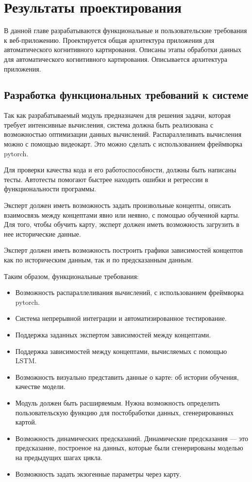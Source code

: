 \chapter{Результаты проектирования}

\begin{annotation}
	В данной главе разрабатываются функциональные и пользовательские требования к веб-приложению.
	Проектируется общая архитектура приложения для автоматического когнитивного картирования.
	Описаны этапы обработки данных для автоматического когнитивного картирования.
	Описывается архитектура приложения.
\end{annotation}


\section{Разработка функциональных требований к системе}

Так как разрабатываемый модуль предназначен для решения задачи, которая
требует интенсивные вычисления, система должна быть реализована
с возможностью оптимизации данных вычислений. Распараллеливать вычисления
можно с помощью видеокарт. Это можно сделать с использованием фреймворка pytorch.

Для проверки качества кода и его работоспособности, должны быть написаны тесты.
Автотесты помогают быстрее находить ошибки и регрессии в функциональности программы.

Эксперт должен иметь возможность задать произвольные концепты, описать
взаимосвязь между концептами явно или неявно, с помощью обученной карты.
Для того, чтобы обучить карту, эксперт должен иметь возможность загрузить
в нее исторические данные.

Эксперт должен иметь возможность построить графики зависимостей концептов
как по историческим данным, так и по предсказанным данным.

Таким образом, функциональные требования:
\begin{itemize}
	\item Возможность распараллеливания вычислений, с использованием фреймворка pytorch.
	\item Система непрерывной интеграции и автоматизированное тестирование.
	\item Поддержка заданных экспертом зависимостей между концептами.
	\item Поддержка зависимостей между концептами, вычисляемых с помощью LSTM.
	\item Возможность визуально представить данные о карте: об истории обучения, качестве модели.
	\item Модуль должен быть расширяемым. Нужна возможность определить пользовательскую функцию для постобработки данных, сгенерированных картой.
	\item Возможность динамических предсказаний. Динамические предсказания --- это
	предсказание, построеное на данных, которые были сгенерированы моделью на предыдущих шагах цикла.
	\item Возможность задать экзогенные параметры через карту.
\end{itemize}

